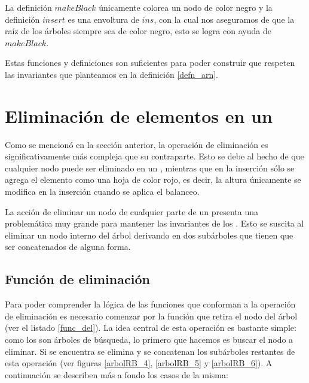 La definici\'on \hyperref[raiz_negra_func]{$makeBlack$} únicamente colorea un nodo de color negro y 
la definición \hyperref[raiz_negra_func]{$insert$} es una envoltura de \hyperref[func_ins]{$ins$}, 
con la cual nos aseguramos de que la ra\'iz de los \'arboles siempre sea de color negro, esto se 
logra con ayuda de \hyperref[raiz_negra_func]{$makeBlack$}.

Estas funciones y definiciones son suficientes para poder construir {\arns} que respeten las
invariantes que planteamos en la definici\'on \ref{defn_arn}.

\section{Eliminación de elementos en un {\arn}}

Como se mencion\'o en la secci\'on anterior, la operaci\'on de eliminaci\'on es significativamente 
m\'as compleja que su contraparte. Esto se debe al hecho de que cualquier nodo puede ser eliminado 
en un {\arn}, mientras que en la inserci\'on s\'olo se agrega el elemento como una hoja de 
color rojo, es decir, la altura \'unicamente se modifica en la inserción cuando se aplica el 
balanceo.

La acci\'on de eliminar un nodo de cualquier parte de un {\arn} presenta una problemática muy grande 
para mantener las invariantes de los {\arns}. Esto se suscita al eliminar un nodo interno del 
\'arbol derivando en dos subárboles que tienen que ser concatenados de alguna forma.

\subsection{Funci\'on de eliminaci\'on}

Para poder comprender la l\'ogica de las funciones que conforman a la operaci\'on de eliminaci\'on
es necesario comenzar por la funci\'on que retira el nodo del \'arbol (ver el listado \ref{func_del}).
La idea central de esta operaci\'on es bastante simple: como los {\arns} son \'arboles de búsqueda,
lo primero que hacemos es buscar el nodo a eliminar. Si se encuentra se elimina y se concatenan los
subárboles restantes de esta operaci\'on (ver figuras \ref{arbolRB_4}, \ref{arbolRB_5} y
\ref{arbolRB_6}). A continuaci\'on se describen m\'as a fondo los casos de la misma:

